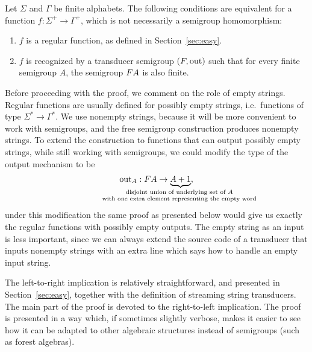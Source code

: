 

\begin{theorem}\label{thm:regular-functions}
    Let  $\Sigma$ and $\Gamma$  be finite alphabets. The following conditions are equivalent for a function $f : \Sigma^+ \to \Gamma^+$, which is not necessarily a semigroup homomorphism:
    \begin{enumerate}
        \item \label{it:regular} $f$ is  a regular function, as defined in  Section~\ref{sec:easy}. 
        \item \label{it:trans-semig-regular}$f$ is recognized by a transducer semigroup $(\functor,\outfun)$ such that for every finite semigroup $A$, the semigroup $\functor A$ is also finite. 
    \end{enumerate}
\end{theorem}


Before proceeding with the proof, we comment on the role of empty strings. Regular functions are usually defined for possibly empty strings, i.e.~functions of type $\Sigma^* \to \Gamma^*$. We use nonempty strings, because it will be more convenient to work with semigroups, and the free semigroup construction produces nonempty strings. To extend the construction to functions that can output possibly empty strings, while still working with semigroups, we could modify the type of the output mechanism to be 
\begin{align*}
\outfun_A : \functor A \to \myunderbrace{A + 1}{disjoint union of underlying set of $A$ \\ with one extra element representing the empty word},
\end{align*}
under this modification the same proof as presented below would give us exactly the regular functions with possibly empty outputs. The empty string as an input is less important, since we can always  extend  the source code of a transducer that inputs nonempty strings with an extra line which says how to handle an empty input string. 


The left-to-right implication is relatively straightforward, and presented in Section~\ref{sec:easy}, together with the definition of streaming string transducers. The main part of the proof  is devoted to the right-to-left implication. The proof is presented in a way which, if sometimes slightly verbose, makes it easier to see how it can be adapted to other algebraic structures instead of semigroups (such as forest algebras).

